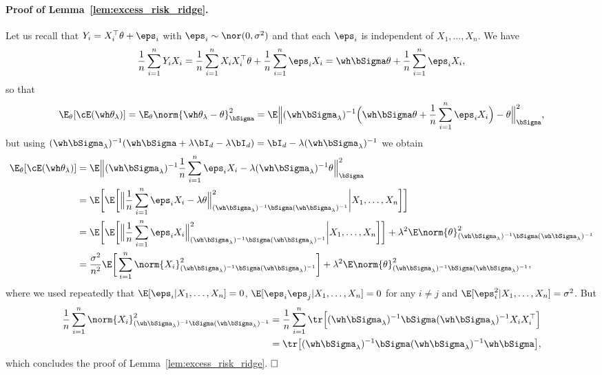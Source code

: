\paragraph{Proof of Lemma~\ref{lem:excess_risk_ridge}.}

Let us recall that $Y_i = X_i^\top \theta + \eps_i$ with $\eps_i \sim \nor(0, \sigma^2)$ and that each $\eps_i$ is independent of $X_1, \ldots, X_n$.
We have
\begin{equation*}
	\frac 1n \sum_{i=1}^n Y_i X_i = \frac 1n \sum_{i=1}^n X_i X_i^\top \theta 
	+ \frac 1n \sum_{i=1}^n \eps_i X_i = \wh \bSigma \theta + \frac 1n \sum_{i=1}^n \eps_i X_i,
\end{equation*}
so that
\begin{equation*}
	\E_{\theta} [\cE(\wh \theta_\lambda)] 
	=  \E_{\theta} \norm{\wh \theta_\lambda - \theta}_{\bSigma}^2 
	= \E \Big\| (\wh \bSigma_\lambda)^{-1} \Big(\wh \bSigma \theta + \frac 1n \sum_{i=1}^n \eps_i X_i \Big) - \theta \Big\|_{\bSigma}^2,
\end{equation*}
but using $(\wh \bSigma_\lambda)^{-1} (\wh \bSigma + \lambda \bI_d - \lambda \bI_d) = \bI_d - \lambda 
(\wh \bSigma_\lambda)^{-1}$ we obtain
\begin{align*}
	\E_{\theta} [\cE(\wh \theta_\lambda)] &= \E \Big\| (\wh \bSigma_\lambda)^{-1} \frac 1n \sum_{i=1}^n \eps_i X_i - \lambda (\wh \bSigma_\lambda)^{-1} \theta \Big\|_{\bSigma}^2 \\
	&= \E \bigg[ \E \bigg[ \Big\| \frac 1n \sum_{i=1}^n \eps_i X_i - \lambda \theta \Big\|_{(\wh \bSigma_\lambda)^{-1} \bSigma (\wh \bSigma_\lambda)^{-1}}^2 \bigg| X_1, \ldots, X_n \bigg] \bigg] \\
	&= \E \bigg[ \E \bigg[ \Big\| \frac 1n \sum_{i=1}^n \eps_i X_i \Big\|_{(\wh \bSigma_\lambda)^{-1} \bSigma (\wh \bSigma_\lambda)^{-1}}^2 \bigg| X_1, \ldots, X_n \bigg] \bigg]  + \lambda^2 \E \norm{\theta}_{(\wh \bSigma_\lambda)^{-1} \bSigma (\wh \bSigma_\lambda)^{-1}}^2 \\
	&= \frac{\sigma^2}{n^2} \E \bigg[ \sum_{i=1}^n \norm{X_i}_{(\wh \bSigma_\lambda)^{-1} \bSigma (\wh \bSigma_\lambda)^{-1}}^2 \bigg]  + \lambda^2 \E \norm{\theta}_{(\wh \bSigma_\lambda)^{-1} \bSigma (\wh \bSigma_\lambda)^{-1}}^2,
\end{align*}
where we used repeatedly that $\E[\eps_i | X_1, \ldots, X_n] = 0$, $\E[\eps_i \eps_j | X_1, \ldots, X_n] = 0$ for any $i \neq j$ and $\E[\eps_i^2 | X_1, \ldots, X_n] = \sigma^2$.
But 
\begin{align*}
	\frac 1n \sum_{i=1}^n \norm{X_i}_{(\wh \bSigma_\lambda)^{-1} \bSigma (\wh \bSigma_\lambda)^{-1}}^2 
	&= \frac 1n \sum_{i=1}^n \tr \Big[ (\wh \bSigma_\lambda)^{-1} \bSigma (\wh \bSigma_\lambda)^{-1} X_i X_i^\top \Big] \\
	&= \tr \big[ (\wh \bSigma_\lambda)^{-1} \bSigma (\wh \bSigma_\lambda)^{-1} \wh \bSigma \big],
\end{align*}
which concludes the proof of Lemma~\ref{lem:excess_risk_ridge}. $\hfill \square$

